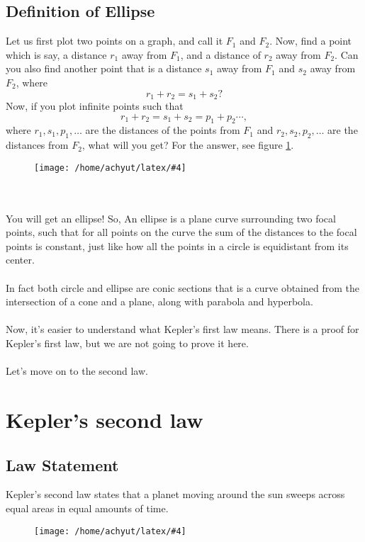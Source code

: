 \documentclass[a4paper]{report}
\newcommand{\mkfig}[5]{
  \begin{figure}[#1]
    \centering
    \texttt{[image: /home/achyut/latex/\#4]}
    \caption{\centering{#5}}
    \label{fig.#2}
  \end{figure}
}
\begin{document}
\subsection{Definition of Ellipse}
Let us first plot two points on a graph, and call it $F_1$ and $F_2$. Now, find a point which is say, 
a distance $r_1$ away from $F_1$, and a distance of $r_2$ away from $F_2$. Can you also find another point that
is a distance $s_1$ away from $F_1$ and $s_2$ away from $F_2$, where $$r_1+r_2=s_1+s_2?$$
Now, if you plot infinite points such that $$r_1+r_2=s_1+s_2=p_1+p_2\cdots,$$ where $r_1, s_1, p_1, \dots$ are the
distances of the points from $F_1$ and $r_2,s_2,p_2,\dots$ are the distances from $F_2$, what will you get? 
For the answer, see figure \ref{fig.1}.
\mkfig{h!}{1}{2}{presentation.1.png}{An ellipse} \\\\
You will get an ellipse! So, An ellipse is a plane curve surrounding two focal points, such that 
for all points on the curve the sum of the distances to the focal points is constant, 
just like how all the points in a circle is equidistant from its center.\\\\
In fact both circle and ellipse are conic sections that is a curve obtained from the intersection of a 
cone and a plane, along with parabola and hyperbola. \\\\
Now, it's easier to understand what Kepler's first law means. There is a proof for Kepler's first law, but
we are not going to prove it here.\\\\
Let's move on to the second law.

\section{Kepler's second law}
\subsection{Law Statement}
Kepler's second law states that a planet moving around the sun sweeps across equal areas in equal amounts of time.
\mkfig{h!}{2}{2}{presentation.2.png}{Kepler's second law} \\
\end{document}
